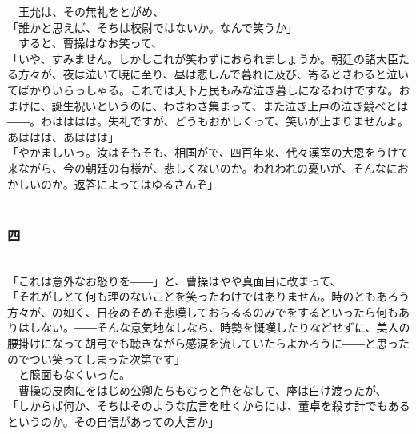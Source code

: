 \documentclass[
  paper=a5,
  fontsize=10pt,
  jafontsize=9.5pt,
  tate,                  %
  open_bracket_pos=nibu, %
]{jlreq}
\begin{document}
　王允は、その無礼をとがめ、\\


「誰かと思えば、そちは校尉ではないか。なんで笑うか」\\


　すると、曹操はなお笑って、\\


「いや、すみません。しかしこれが笑わずにおられましょうか。朝廷の諸大臣たる方々が、夜は泣いて暁に至り、昼は悲しんで暮れに及び、寄るとさわると泣いてばかりいらっしゃる。これでは天下万民もみな泣き暮しになるわけですな。おまけに、誕生祝いというのに、わさわさ集まって、また泣き上戸の泣き競べとは――。わはははは。失礼ですが、どうもおかしくって、笑いが止まりませんよ。あははは、あははは」\\


「やかましいっ。汝はそもそも、相国がで、四百年来、代々漢室の大恩をうけて来ながら、今の朝廷の有様が、悲しくないのか。われわれの憂いが、そんなにおかしいのか。返答によってはゆるさんぞ」\\

\\

\subsubsection{四}

\\


「これは意外なお怒りを――」と、曹操はやや真面目に改まって、\\


「それがしとて何も理のないことを笑ったわけではありません。時のともあろう方々が、の如く、日夜めそめそ悲嘆しておらるるのみでをするといったら何もありはしない。――そんな意気地なしなら、時勢を慨嘆したりなどせずに、美人の腰掛けになって胡弓でも聴きながら感涙を流していたらよかろうに――と思ったのでつい笑ってしまった次第です」\\


　と臆面もなくいった。\\


　曹操の皮肉にをはじめ公卿たちもむっと色をなして、座は白け渡ったが、\\


「しからば何か、そちはそのような広言を吐くからには、董卓を殺す計でもあるというのか。その自信があっての大言か」\\
\end{document}
